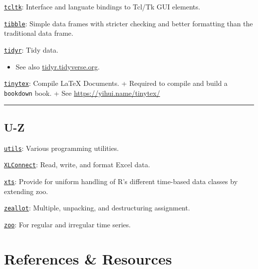 \documentclass[]{book}
\providecommand{\tightlist}{%
  \setlength{\itemsep}{0pt}\setlength{\parskip}{0pt}}
\begin{document}
\href{https://www.rdocumentation.org/packages/tcltk/versions/3.5.2}{\texttt{tcltk}}: Interface and languate bindings to Tcl/Tk GUI elements.

\href{https://CRAN.R-project.org/package=tibble}{\texttt{tibble}}: Simple data frames with stricter checking and better formatting than the traditional data frame.

\href{https://CRAN.R-project.org/package=tidyr}{\texttt{tidyr}}: Tidy data.

\begin{itemize}
\tightlist
\item
  See also \href{https://tidyr.tidyverse.org/}{tidyr.tidyverse.org}.
\end{itemize}

\href{https://CRAN.R-project.org/package=tinytex}{\texttt{tinytex}}: Compile LaTeX Documents.
+ Required to compile and build a \texttt{bookdown} book.
+ See \url{https://yihui.name/tinytex/}

\begin{center}\rule{0.5\linewidth}{\linethickness}\end{center}

\hypertarget{u-z}{%
\section{U-Z}\label{u-z}}

\href{https://CRAN.R-project.org/package=R.utils}{\texttt{utils}}: Various programming utilities.

\href{https://CRAN.R-project.org/package=XLConnect}{\texttt{XLConnect}}: Read, write, and format Excel data.

\href{https://CRAN.R-project.org/package=xts}{\texttt{xts}}: Provide for uniform handling of R's different time-based data classes by extending zoo.

\href{https://CRAN.R-project.org/package=zeallot}{\texttt{zeallot}}: Multiple, unpacking, and destructuring assignment.

\href{https://CRAN.R-project.org/package=zoo}{\texttt{zoo}}: For regular and irregular time series.

\hypertarget{references-resources}{%
\chapter{References \& Resources}\label{references-resources}}
\end{document}
